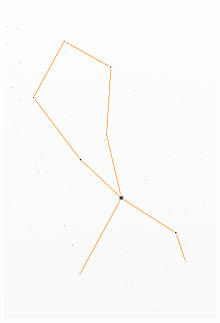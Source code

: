 \documentclass[12pt,a4paper,titlepage]{article}
\begin{document}
\begin{figure}[H]
	\centering
	\begin{minipage}{.45\textwidth}
	  \centering
	  \includegraphics[width=1\linewidth]{-4000.png}
	  ~\label{fig:-4000}
	\end{minipage}%
	\hspace{.8cm}
	\begin{minipage}{.45\textwidth}
	  \centering

\end{minipage}
\end{figure}
\end{document}
